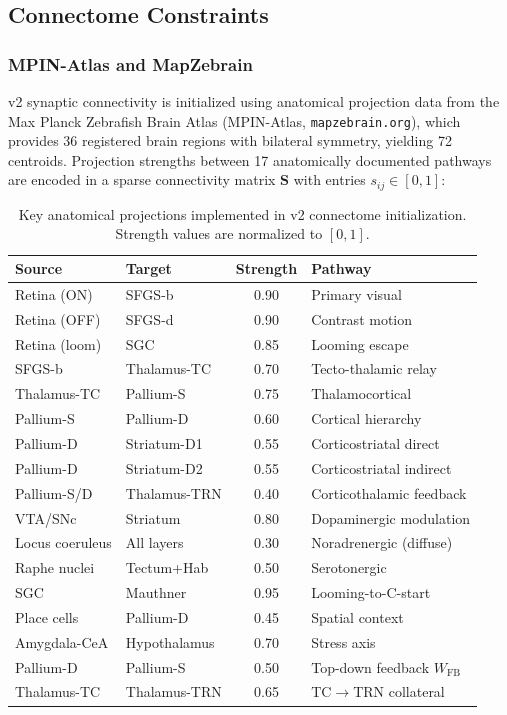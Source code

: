\documentclass[11pt,a4paper]{article}
\begin{document}
\subsection{Connectome Constraints}\label{sec:connectome}

\subsubsection{MPIN-Atlas and MapZebrain}

v2 synaptic connectivity is initialized using anatomical projection
data from the Max Planck Zebrafish Brain Atlas (MPIN-Atlas,
\texttt{mapzebrain.org}), which provides 36 registered brain regions
with bilateral symmetry, yielding 72 centroids.
Projection strengths between 17 anatomically documented pathways
are encoded in a sparse connectivity matrix $\mathbf{S}$ with entries
$s_{ij} \in [0, 1]$:

\begin{table}[H]
\centering
\caption{Key anatomical projections implemented in v2 connectome initialization.
  Strength values are normalized to $[0,1]$.}
\label{tab:connectome}
\small
\begin{tabular}{llcl}
\toprule
Source & Target & Strength & Pathway \\
\midrule
Retina (ON)      & SFGS-b       & 0.90 & Primary visual \\
Retina (OFF)     & SFGS-d       & 0.90 & Contrast motion \\
Retina (loom)    & SGC          & 0.85 & Looming escape \\
SFGS-b           & Thalamus-TC  & 0.70 & Tecto-thalamic relay \\
Thalamus-TC      & Pallium-S    & 0.75 & Thalamocortical \\
Pallium-S        & Pallium-D    & 0.60 & Cortical hierarchy \\
Pallium-D        & Striatum-D1  & 0.55 & Corticostriatal direct \\
Pallium-D        & Striatum-D2  & 0.55 & Corticostriatal indirect \\
Pallium-S/D      & Thalamus-TRN & 0.40 & Corticothalamic feedback \\
VTA/SNc          & Striatum     & 0.80 & Dopaminergic modulation \\
Locus coeruleus  & All layers   & 0.30 & Noradrenergic (diffuse) \\
Raphe nuclei     & Tectum+Hab   & 0.50 & Serotonergic \\
SGC              & Mauthner     & 0.95 & Looming-to-C-start \\
Place cells      & Pallium-D    & 0.45 & Spatial context \\
Amygdala-CeA     & Hypothalamus & 0.70 & Stress axis \\
Pallium-D        & Pallium-S    & 0.50 & Top-down feedback $W_\mathrm{FB}$ \\
Thalamus-TC      & Thalamus-TRN & 0.65 & TC$\to$TRN collateral \\
\bottomrule
\end{tabular}
\end{table}
\end{document}

